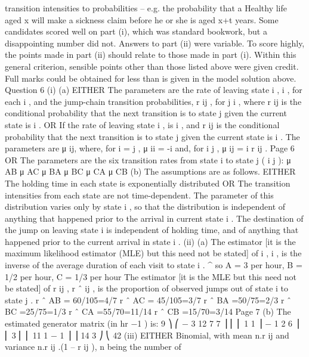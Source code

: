 \documentclass[a4paper,12pt]{article}
\begin{document}
\begin{enumerate}
transition intensities to probabilities – e.g. the probability that a Healthy life aged x will make a sickness claim before he or she is aged x+t years.
Some candidates scored well on part (i), which was standard bookwork, but a disappointing
number did not. Answers to part (ii) were variable. To score highly, the points made in part
(ii) should relate to those made in part (i). Within this general criterion, sensible points other
than those listed above were given credit. Full marks could be obtained for less than is given
in the model solution above.
Question 6
(i)
(a)
EITHER
The parameters are the rate of leaving state i , \lambda i , for each i , and the jump-chain
transition probabilities, r ij , for j \neq i , where r ij is the conditional probability that
the next transition is to state j given the current state is i .
OR
If the rate of leaving state i , is \lambda i , and r ij is the conditional probability that the
next transition is to state j given the current state is i .
The parameters are μ ij, where, for i = j , μ ii = -\lambda i and, for i \neq j , μ ij = \lambda i r ij .
Page 6%
OR
The parameters are the six transition rates from state i to state j ( i \neq j ):
μ AB
μ AC
μ BA
μ BC
μ CA
μ CB
(b)
The assumptions are as follows.
EITHER The holding time in each state is exponentially distributed
OR The transition intensities from each state are not time-dependent.
The parameter of this distribution varies only by state i , so that the distribution
is independent of anything that happened prior to the arrival in current state i .
The destination of the jump on leaving state i is independent of holding time,
and of anything that happened prior to the current arrival in state i .
(ii)
(a)
The estimator [it is the maximum likelihood estimator (MLE)
but this need not be stated] of \lambda i , \hat{\lambda} i , is the inverse of the
average duration of each visit to state i .
^
so \hat{\lambda} A = 3 per hour, \hat{\lambda} B = 1/2 per hour, \lambda C = 1/3 per hour
The estimator [it is the MLE but this need not be stated]
of r ij , r ˆ ij , is the proportion of observed jumps out of
state i to state j .
r ˆ AB = 60/105=4/7
r ˆ AC = 45/105=3/7
r ˆ BA =50/75=2/3
r ˆ BC =25/75=1/3
r ˆ CA =55/70=11/14
r ˆ CB =15/70=3/14
Page 7%
(b)
The estimated generator matrix (in hr −1 ) is:
9 ⎞
⎛ − 3 12
7
7 ⎟
⎜
⎜ 1
1 ⎟
− 1
2
6 ⎟
⎜ 3
⎜ ⎜ 11
1
− 1 ⎟ ⎟
14
3 ⎠
⎝ 42
(iii)
EITHER Binomial, with mean n.r ij and variance n.r ij .(1 – r ij ), n being the number of

\end{enumerate}
\end{document}
